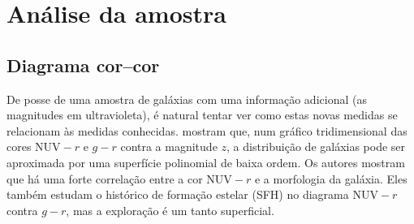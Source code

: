 



\chapter{Análise da amostra \STARLIGHTUV}
\label{sec:Analise}



\section{Diagrama cor--cor}

De posse de uma amostra de galáxias com uma informação adicional (as magnitudes
em ultravioleta), é natural tentar ver como estas novas medidas se relacionam às
medidas conhecidas. \citet{Chilingarian2011} mostram que, num gráfico
tridimensional das cores $\mathrm{NUV}-r$ e $g-r$ contra a magnitude $z$, a
distribuição de galáxias pode ser aproximada por uma superfície polinomial de
baixa ordem. Os autores mostram que há uma forte correlação entre a cor
$\mathrm{NUV}-r$ e a morfologia da galáxia. Eles também estudam o histórico de
formação estelar (SFH) no diagrama $\mathrm{NUV}-r$ contra $g-r$, mas a
exploração é um tanto superficial.

